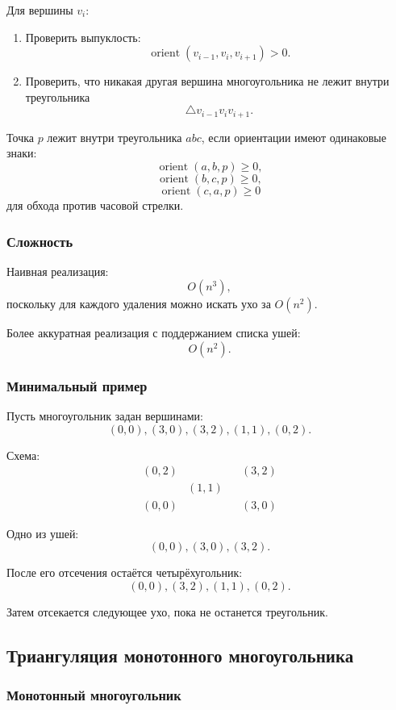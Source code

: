 \documentclass[12pt,a4paper]{article}
\begin{document}
Для вершины \(v_i\):

\begin{enumerate}
    \item Проверить выпуклость:
    \[
    \operatorname{orient}(v_{i-1},v_i,v_{i+1})>0.
    \]
    \item Проверить, что никакая другая вершина многоугольника не лежит внутри треугольника
    \[
    \triangle v_{i-1}v_iv_{i+1}.
    \]
\end{enumerate}

Точка \(p\) лежит внутри треугольника \(abc\), если ориентации имеют одинаковые знаки:
\[
\operatorname{orient}(a,b,p)\ge 0,
\]
\[
\operatorname{orient}(b,c,p)\ge 0,
\]
\[
\operatorname{orient}(c,a,p)\ge 0
\]
для обхода против часовой стрелки.

\subsubsection{Сложность}

Наивная реализация:
\[
O(n^3),
\]
поскольку для каждого удаления можно искать ухо за \(O(n^2)\).

Более аккуратная реализация с поддержанием списка ушей:
\[
O(n^2).
\]

\subsubsection{Минимальный пример}

Пусть многоугольник задан вершинами:
\[
(0,0),(3,0),(3,2),(1,1),(0,2).
\]

Схема:
\[
\begin{array}{ccccc}
(0,2) & & & (3,2)\\
 & (1,1) & & \\
(0,0) & & & (3,0)
\end{array}
\]

Одно из ушей:
\[
(0,0),(3,0),(3,2).
\]

После его отсечения остаётся четырёхугольник:
\[
(0,0),(3,2),(1,1),(0,2).
\]

Затем отсекается следующее ухо, пока не останется треугольник.

\subsection{Триангуляция монотонного многоугольника}

\subsubsection{Монотонный многоугольник}
\end{document}
